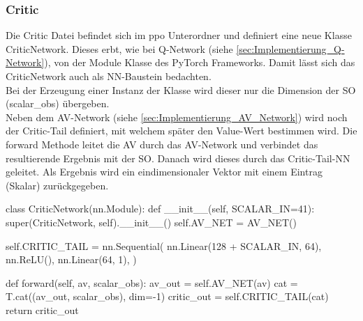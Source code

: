 \subsubsection{Critic}
Die Critic Datei befindet sich im ppo Unterordner und definiert eine neue Klasse CriticNetwork. Dieses erbt, wie bei Q-Network (siehe \ref{sec:Implementierung_Q-Network}), von der Module Klasse des PyTorch Frameworks. Damit lässt sich das CriticNetwork auch als NN-Baustein bedachten.\\
Bei der Erzeugung einer Instanz der Klasse wird dieser nur die Dimension der SO (scalar\_obs) übergeben.\\
Neben dem AV-Network (siehe \ref{sec:Implementierung_AV_Network}) wird noch der Critic-Tail definiert, mit welchem später den Value-Wert bestimmen wird. Die forward Methode leitet die AV durch das AV-Network und verbindet das resultierende Ergebnis mit der SO. Danach wird dieses durch das Critic-Tail-NN geleitet. Als Ergebnis wird ein eindimensionaler Vektor mit einem Eintrag (Skalar) zurückgegeben.
\begin{python}
	class CriticNetwork(nn.Module):
		def __init__(self, SCALAR_IN=41):
			super(CriticNetwork, self).__init__()
			self.AV_NET = AV_NET()
			
			self.CRITIC_TAIL = nn.Sequential(
				nn.Linear(128 + SCALAR_IN, 64),
				nn.ReLU(),
				nn.Linear(64, 1),
			)
		
		def forward(self, av, scalar_obs):
			av_out = self.AV_NET(av)
			cat = T.cat((av_out, scalar_obs), dim=-1)
			critic_out = self.CRITIC_TAIL(cat)
			return critic_out
\end{python}

